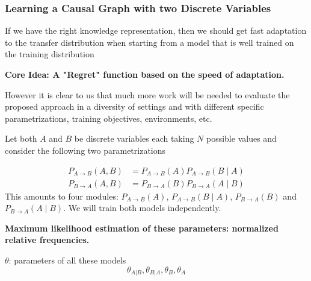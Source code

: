\documentclass{beamer}
\begin{document}
\begin{frame}
\frametitle{Learning a Causal Graph with two Discrete Variables}
If we have the right knowledge representation, then we should get fast adaptation to the transfer distribution when starting from a model that is well trained on the training distribution
\vspace{1cm}

\textbf{Core Idea:  A "Regret" function based on the speed of adaptation.}
\vspace{0.5cm}

However it is clear to us that much more work will be needed to evaluate the proposed approach in a diversity of settings and with different specific parametrizations, training objectives, environments, etc.
\end{frame}

\begin{frame}
Let both $A$ and $B$ be discrete variables each taking $N$ possible values and consider the following two parametrizations

\begin{align*}
\label{eq:bivariate-models}
P_{A\rightarrow B}(A,B)&=P_{A\rightarrow B}(A) P_{A\rightarrow B}(B\mid A) \nonumber \\
P_{B\rightarrow A}(A,B)&=P_{B\rightarrow A}(B) P_{B\rightarrow A}(A \mid B) 
\end{align*}
This amounts to four modules: $P_{A\rightarrow B}(A)$, $P_{A\rightarrow B}(B\mid A)$, $P_{B\rightarrow A}(B)$ and $P_{B\rightarrow A}(A\mid B)$. We will train both models independently.
\vspace{0.3cm}

\textbf{Maximum likelihood estimation of these parameters: normalized relative frequencies.}

$\theta$: parameters of all these models
$$\theta_{A|B}, \theta_{B|A}, \theta_{B}, \theta_{A}$$ 

\end{frame}
\end{document}
